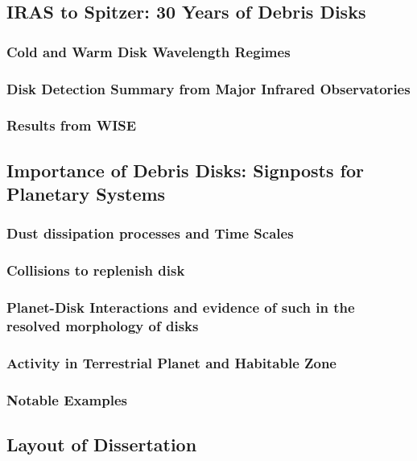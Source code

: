         
    \subsection{IRAS to Spitzer: 30 Years of Debris Disks}\label{sec:30years}
    
        \subsubsection{Cold and Warm Disk Wavelength Regimes}

        \subsubsection{Disk Detection Summary from Major Infrared Observatories}\label{sec:IR_observatories}
        
        \subsubsection{Results from WISE}\label{sec:past_wise}
        
        
    \subsection{Importance of Debris Disks: Signposts for Planetary Systems}
        
        \subsubsection{Dust dissipation processes and Time Scales}
        
        \subsubsection{Collisions to replenish disk}
        
        \subsubsection{Planet-Disk Interactions and evidence of such in the resolved morphology of disks}
    
    
        \subsubsection{Activity in Terrestrial Planet and Habitable Zone}
        
        
        \subsubsection{Notable Examples}

    \subsection{Layout of Dissertation}

        